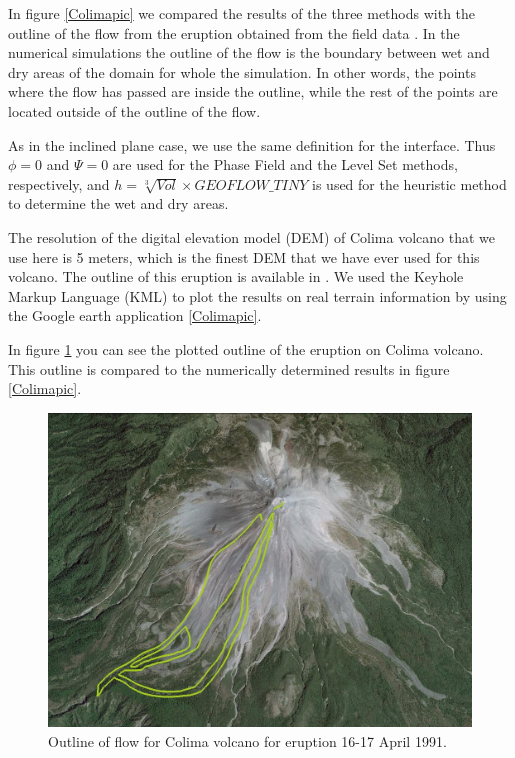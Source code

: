 \documentclass[letterpaper,10pt]{article}
\begin{document}
In figure \ref{Colimapic} we compared the results of the three methods with the outline of the flow from the eruption obtained from the field data \cite{Rupp2006}. 
In the numerical simulations the outline of the flow is the boundary between wet and dry areas of the domain for whole the simulation. In other words, the points where the flow has
passed are inside the outline, while the rest of the points are located outside of the outline of the flow. 

As in the inclined plane case, we use the same definition for the interface.
Thus $\phi=0$ and $\varPsi=0$ are used for the Phase Field and the Level Set methods, respectively, and $h=\sqrt[3]{Vol} \times GEOFLOW\_TINY $ 
is used for the heuristic method to determine the wet and dry areas.
 
The resolution of the digital elevation model (DEM) of Colima volcano that we use here is 5 meters, which is the finest DEM 
that we have ever used for this volcano.
The outline of this eruption is available in \cite{NamikawaPhD}.
We used the Keyhole Markup Language (KML) to plot the results on real terrain information by using the Google earth application \ref{Colimapic}. 

In figure \ref{colima_outline} you can see the plotted outline of the eruption on Colima volcano. 
This outline is compared to the numerically determined results in figure \ref{Colimapic}.

\begin{figure}[H]
\centering
\includegraphics[width=.5\textwidth]{IMAGES/outline1.jpg}
\caption{Outline of flow for Colima volcano for eruption 16-17 April 1991.}
 \label{colima_outline}

\end{figure}
\end{document}
